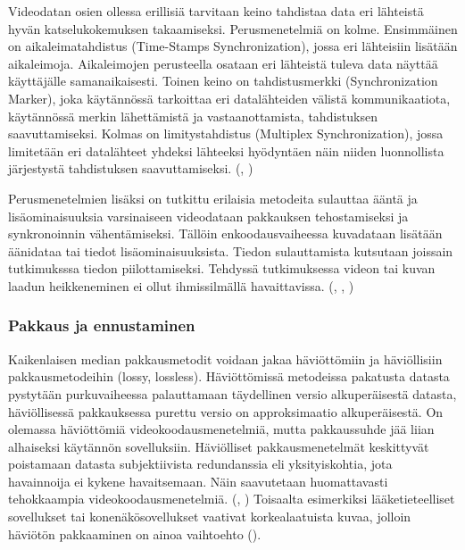 Videodatan osien ollessa erillisiä tarvitaan keino tahdistaa data eri
lähteistä hyvän katselukokemuksen takaamiseksi. Perusmenetelmiä on kolme.
Ensimmäinen on aikaleimatahdistus (Time-Stamps Synchronization), jossa eri
lähteisiin lisätään aikaleimoja. Aikaleimojen perusteella osataan eri lähteistä
tuleva data näyttää käyttäjälle samanaikaisesti. Toinen keino on
tahdistusmerkki (Synchronization Marker), joka käytännössä tarkoittaa eri datalähteiden välistä
kommunikaatiota, käytännössä merkin lähettämistä ja vastaanottamista, tahdistuksen
saavuttamiseksi. Kolmas on limitystahdistus (Multiplex Synchronization), jossa
limitetään eri datalähteet yhdeksi lähteeksi hyödyntäen näin niiden
luonnollista järjestystä tahdistuksen saavuttamiseksi. (\citealt{sync}, \citealt{mujal})

Perusmenetelmien lisäksi on tutkittu erilaisia metodeita
sulauttaa ääntä ja lisäominaisuuksia varsinaiseen videodataan pakkauksen tehostamiseksi
ja synkronoinnin vähentämiseksi.
Tällöin enkoodausvaiheessa kuvadataan lisätään äänidataa tai tiedot lisäominaisuuksista.
Tiedon sulauttamista kutsutaan joissain tutkimuksssa tiedon piilottamiseksi.
Tehdyssä tutkimuksessa videon tai kuvan laadun heikkeneminen ei ollut ihmissilmällä
havaittavissa. (\citealt{sync}, \citealt{mujal}, \citealt{hiding})

\subsubsection{Pakkaus ja ennustaminen}

Kaikenlaisen median pakkausmetodit voidaan jakaa häviöttömiin
ja häviöllisiin pakkausmetodeihin (lossy, lossless). Häviöttömissä metodeissa pakatusta datasta
pystytään purkuvaiheessa palauttamaan täydellinen versio alkuperäisestä
datasta, häviöllisessä pakkauksessa purettu versio on approksimaatio
alkuperäisestä. On olemassa häviöttömiä videokoodausmenetelmiä, mutta
pakkaussuhde jää liian alhaiseksi käytännön sovelluksiin. Häviölliset
pakkausmenetelmät keskittyvät poistamaan datasta subjektiivista redundanssia
eli yksityiskohtia, jota havainnoija ei kykene havaitsemaan. Näin
saavutetaan huomattavasti tehokkaampia videokoodausmenetelmiä. (\citealt{h264}, \citealt{du})
Toisaalta esimerkiksi lääketieteelliset sovellukset tai konenäkösovellukset
vaativat korkealaatuista kuvaa, jolloin häviötön pakkaaminen on ainoa
vaihtoehto (\citealt{xu}).

